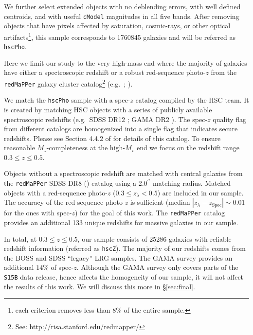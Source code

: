 \documentclass[a4paper,fleqn,usenatbib]{mnras}
\def\arcsec{{\prime\prime}}
\def\redm{\texttt{redMaPPer}}
\def\mstar{{$M_{\star}$}}
\begin{document}
    We further select extended objects with no deblending errors, with well defined 
    centroids, and with useful \texttt{cModel} magnitudes in all five bands. 
    After removing objects that have pixels affected by saturation, cosmic-rays, or 
    other optical artifacts\footnote{each criterion removes less than 8\% of the 
    entire sample.}, this sample corresponds to 1760845 galaxies and will be referred 
    as \texttt{hscPho}. 
        
    Here we limit our study to the very high-mass end where the majority of galaxies 
    have either a spectroscopic redshift or a robust red-sequence photo-$z$ from the 
    \redm{} galaxy cluster catalog\footnote{See: http://risa.stanford.edu/redmapper/} 
    (e.g.\ \citealt{Rykoff2014}; \citealt{Rozo2015b}).  

    We match the \texttt{hscPho} sample with a spec-$z$ catalog compiled by the HSC 
    team.
    It is created by matching HSC objects with a series of publicly available 
    spectroscopic redshifts (e.g.\ SDSS DR12 \citealt{SDSSDR12}; 
    GAMA DR2 \citealt{Liske2015}). 
    The spec-$z$ quality flag from different catalogs are homogenized into a single 
    flag that indicates secure redshifts.
    Please see Section 4.4.2 of \citet{HSC_DR1} for details of this catalog.  
    To ensure reasonable \mstar{}-completeness at the high-\mstar{} end we focus on
    the redshift range $0.3 \leq z \leq 0.5$. 
   
    Objects without a spectroscopic redshift are matched with central 
    galaxies from the \redm{} SDSS DR8 (\citealt{Rykoff2014}) catalog using a 
    $2.0^{\arcsec}$ matching radius. 
    Matched objects with a red-sequence photo-$z$ ($0.3 \leq z_{\lambda} < 0.5$) are 
    included in our sample. 
    The accuracy of the red-sequence photo-$z$ is sufficient (median 
    $|z_{\lambda} - z_{\mathrm{Spec}}| {\sim} 0.01$ for the ones with spec-$z$) 
    for the goal of this work.
    The \redm{} catalog provides an additional 133 unique redshifts for massive 
    galaxies in our sample.
        
    In total, at $0.3 \leq z \leq 0.5$, our sample consists of 25286 galaxies with 
    reliable redshift information (referred as \texttt{hscZ}).
    The majority of our redshifts comes from the BOSS and SDSS ``legacy'' LRG samples. 
    The GAMA survey provides an additional $14$\% of spec-$z$.
    Although the GAMA survey only covers parts of the \texttt{S15B} data release, hence affects 
    the homogeneity of our sample, it will not affect the results of this work.
    We will discuss this more in \S \ref{sec:final}.
\end{document}
